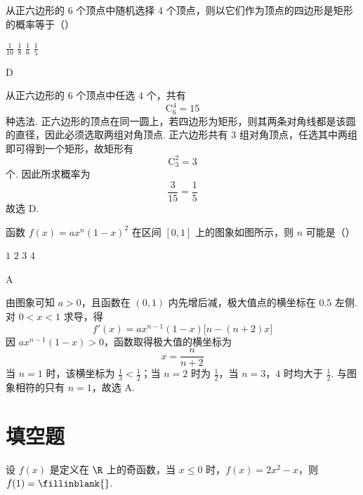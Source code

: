 \begin{problem}
从正六边形的 6 个顶点中随机选择 4 个顶点，则以它们作为顶点的四边形是矩形的概率等于（\quad）

\choices
    {\(\frac{1}{10}\)}
    {\(\frac{1}{8}\)}
    {\(\frac{1}{6}\)}
    {\(\frac{1}{5}\)}
\end{problem}

\begin{answer}
D
\end{answer}

\begin{solution}
从正六边形的 \(6\) 个顶点中任选 \(4\) 个，共有
\[
\mathrm C_{6}^{4}=15
\]
种选法. 正六边形的顶点在同一圆上，若四边形为矩形，则其两条对角线都是该圆的直径，因此必须选取两组对角顶点. 正六边形共有 \(3\) 组对角顶点，任选其中两组即可得到一个矩形，故矩形有
\[
\mathrm C_{3}^{2}=3
\]
个.
因此所求概率为
\[
\frac{3}{15}=\frac15
\]
故选 D.
\end{solution}

\begin{problem}
函数 \(f(x) = ax^{n}(1 - x)^{2}\) 在区间 \([0, 1]\) 上的图象如图所示，则 \(n\) 可能是（\quad）


\choices
    {\(1\)}
    {\(2\)}
    {\(3\)}
    {\(4\)}
\end{problem}

\begin{answer}
A
\end{answer}

\begin{solution}
由图象可知 \(a>0\)，且函数在 \((0,1)\) 内先增后减，极大值点的横坐标在 \(0.5\) 左侧. 对 \(0<x<1\) 求导，得
\[
f'(x)=a x^{n-1}(1-x)\bigl[n-(n+2)x\bigr]
\]
因 \(a x^{n-1}(1-x)>0\)，函数取得极大值的横坐标为
\[
x=\frac{n}{n+2}
\]
当 \(n=1\) 时，该横坐标为 \(\frac13<\frac12\)；当 \(n=2\) 时为 \(\frac12\)，当 \(n=3\)，\(4\) 时均大于 \(\frac12\). 与图象相符的只有 \(n=1\)，故选 A.
\end{solution}

\section{填空题}

\begin{problem}
设 \(f(x)\) 是定义在 \(\R\) 上的奇函数，当 \(x \leqslant 0\) 时，\(f(x) = 2x^{2} - x\)，则 \(f(1) =\fillinblank{}\).
\end{problem}

